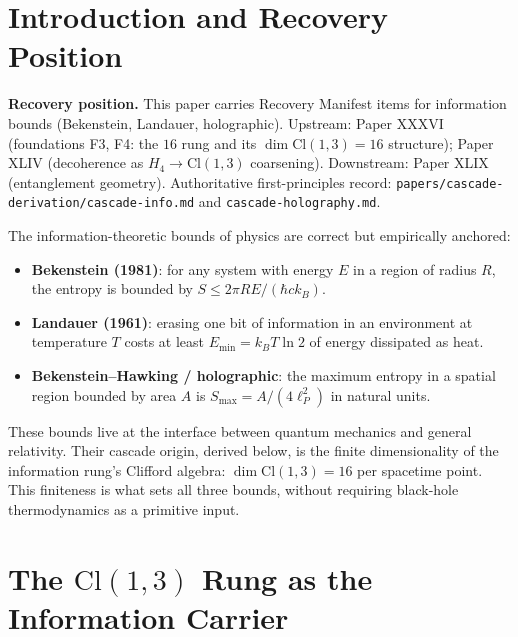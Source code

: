 \documentclass[12pt]{article}
\theoremstyle{remark}
\begin{document}
\section{Introduction and Recovery Position}\label{sec:intro}

\textbf{Recovery position.} This paper carries Recovery Manifest items for information bounds (Bekenstein, Landauer, holographic). Upstream: Paper XXXVI (foundations F3, F4: the $16$ rung and its $\dim \mathrm{Cl}(1,3) = 16$ structure); Paper XLIV (decoherence as $H_4 \to \mathrm{Cl}(1,3)$ coarsening). Downstream: Paper XLIX (entanglement geometry). Authoritative first-principles record: \texttt{papers/cascade-derivation/cascade-info.md} and \texttt{cascade-holography.md}.

The information-theoretic bounds of physics are correct but empirically anchored:
\begin{itemize}
\item \textbf{Bekenstein (1981)}: for any system with energy $E$ in a region of radius $R$, the entropy is bounded by $S \le 2\pi R E / (\hbar c k_B)$.
\item \textbf{Landauer (1961)}: erasing one bit of information in an environment at temperature $T$ costs at least $E_{\min} = k_B T \ln 2$ of energy dissipated as heat.
\item \textbf{Bekenstein--Hawking / holographic}: the maximum entropy in a spatial region bounded by area $A$ is $S_{\max} = A / (4\ell_P^2)$ in natural units.
\end{itemize}

These bounds live at the interface between quantum mechanics and general relativity. Their cascade origin, derived below, is the finite dimensionality of the information rung's Clifford algebra: $\dim \mathrm{Cl}(1,3) = 16$ per spacetime point. This finiteness is what sets all three bounds, without requiring black-hole thermodynamics as a primitive input.

\section{The $\mathrm{Cl}(1,3)$ Rung as the Information Carrier}\label{sec:rung}
\end{document}
